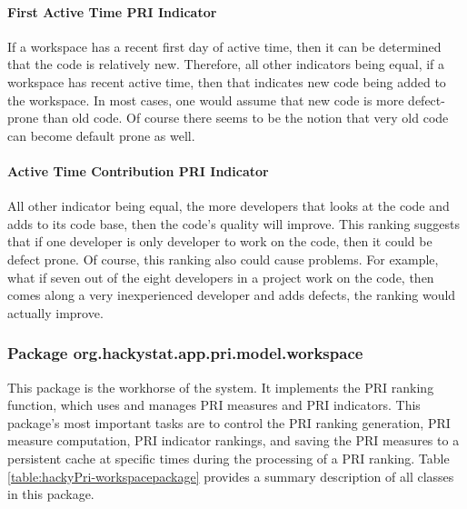 \paragraph{First Active Time PRI Indicator}
If a workspace has a recent first day of active time, then it can be
determined that the code is relatively new. Therefore, all other indicators
being equal, if a workspace has recent active time, then that indicates new
code being added to the workspace. In most cases, one would assume that new
code is more defect-prone than old code. Of course there seems to be the
notion that very old code can become default prone as well.

\paragraph{Active Time Contribution PRI Indicator}
All other indicator being equal, the more developers that looks at the code
and adds to its code base, then the code's quality will improve. This
ranking suggests that if one developer is only developer to work on the
code, then it could be defect prone. Of course, this ranking also could
cause problems. For example, what if seven out of the eight developers in a
project work on the code, then comes along a very inexperienced developer
and adds defects, the ranking would actually improve.




\subsubsection{Package org.hackystat.app.pri.model.workspace} 
This package is the workhorse of the system. It implements the PRI ranking
function, which uses and manages PRI measures and PRI indicators. This
package's most important tasks are to control the PRI ranking generation,
PRI measure computation, PRI indicator rankings, and saving the PRI
measures to a persistent cache at specific times during the processing of a
PRI ranking. Table \ref{table:hackyPri-workspacepackage} provides a summary
description of all classes in this package.

